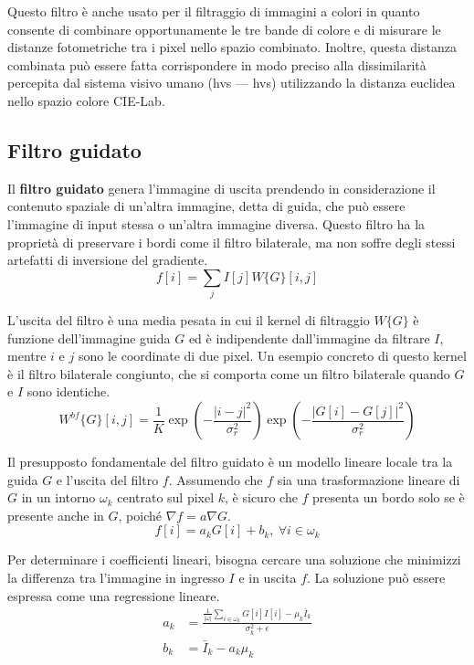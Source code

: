 \documentclass[../main.tex]{subfiles}
\begin{document}
Questo filtro è anche usato per il filtraggio di immagini a colori in quanto consente di combinare opportunamente le tre bande di colore e di misurare le distanze fotometriche tra i pixel nello spazio combinato. Inoltre, questa distanza combinata può essere fatta corrispondere in modo preciso alla dissimilarità percepita dal sistema visivo umano (\acrlong{hvs} --- \acrshort{hvs}) utilizzando la distanza euclidea nello spazio colore CIE-Lab.\cite{wyszecki_2000}

\subsection{Filtro guidato}

Il \textbf{filtro guidato} genera l'immagine di uscita prendendo in considerazione il contenuto spaziale di un'altra immagine, detta di guida, che può essere l'immagine di input stessa o un'altra immagine diversa. Questo filtro ha la proprietà di preservare i bordi come il filtro bilaterale, ma non soffre degli stessi artefatti di inversione del gradiente.\cite{durand_2002}
\begin{equation}
	f[i] = \sum_{j}I[j]W\{G\}[i,j]
\end{equation}

L'uscita del filtro è una media pesata in cui il kernel di filtraggio $W\{G\}$ è funzione dell'immagine guida $G$ ed è indipendente dall'immagine da filtrare $I$, mentre $i$ e $j$ sono le coordinate di due pixel. Un esempio concreto di questo kernel è il filtro bilaterale congiunto, che si comporta come un filtro bilaterale quando $G$ e $I$ sono identiche.\cite{petschnigg_2004}
\begin{equation}
	W^{bf}\{G\}[i,j] = \frac{1}{K} \exp\left(-\frac{|i-j|^2}{\sigma^2_r}\right) \exp\left(-\frac{|G[i]-G[j]|^2}{\sigma_r^2}\right)
\end{equation} 

Il presupposto fondamentale del filtro guidato è un modello lineare locale tra la guida $G$ e l'uscita del filtro $f$. Assumendo che $f$ sia una trasformazione lineare di $G$ in un intorno $\omega_k$ centrato sul pixel $k$, è sicuro che $f$ presenta un bordo solo se è presente anche in $G$, poiché $\nabla f = a\nabla G$.\cite{he_2013}
\begin{equation}
	f[i] = a_kG[i]+b_k,\ \forall i\in\omega_k
\end{equation}

Per determinare i coefficienti lineari, bisogna cercare una soluzione che minimizzi la differenza tra l'immagine in ingresso $I$ e in uscita $f$. La soluzione può essere espressa come una regressione lineare.
\begin{align}
	a_k &= \frac{\frac{1}{|\omega|}\sum_{i\in\omega_k}G[i]I[i]-\mu_k\bar{I}_k}{\sigma_k^2+\epsilon}\\
	b_k &= \bar{I}_k-a_k\mu_k
\end{align}
\end{document}

